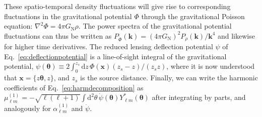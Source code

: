 \documentclass[prd,aps,10pt,nofootinbib,twocolumn,superscriptaddress,preprintnumbers,balancelastpage,longbibliography]{revtex4-1}
\newcommand{\vect}[1]{\boldsymbol{\mathbf{#1}}}
\newcommand{\dd}{\mathrm{d}}
\newcommand{\GN}{G_\mathrm{N}}
\begin{document}
These spatio-temporal density fluctuations will give rise to corresponding fluctuations in the gravitational potential $\Phi$ through the gravitational Poisson equation: $\nabla^2 \Phi = 4 \pi \GN \rho$. The power spectra of the gravitational potential fluctuations can thus be written as $P_{\dot{\Phi}}(\vect{k}) = (4\pi \GN)^2 P_{\dot{\rho}}(\vect{k})/\vect{k}^4$ and likewise for higher time derivatives. The reduced lensing deflection potential $\psi$ of Eq.~\ref{eq:deflectionpotential} is a line-of-sight integral of the gravitational potential, $\psi(\vect{\theta}) \equiv 2 \int_0^{z_s} \dd z \, \Phi(\vect{x}) (z_s - z)/(z_s z)$, where it is now understood that $\vect{x} = \lbrace z \vect{\theta},z\rbrace$, and $z_s$ is the source distance. Finally, we can write the harmonic coefficients of Eq.~\ref{eq:harmdecomposition} as $\mu_{\ell m}^{(1)} = - \sqrt{\ell(\ell+1)} \int \dd^2\theta\, \dot{\psi}(\vect{\theta}) Y_{\ell m}^*(\vect{\theta})$ after integrating by parts, and analogously for $\alpha_{\ell m}^{(1)}$ and $\ddot{\psi}$.
\end{document}
